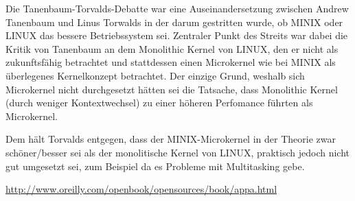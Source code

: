 \documentclass[numbers=noendperiod]{scrartcl}
\begin{document}
Die Tanenbaum-Torvalds-Debatte war eine Auseinandersetzung zwischen Andrew Tanenbaum und Linus Torwalds in der darum gestritten wurde, ob MINIX oder LINUX das bessere Betriebssystem sei. Zentraler Punkt des Streits war dabei die Kritik von Tanenbaum an dem Monolithic Kernel von LINUX, den er nicht als zukunftsfähig betrachtet und stattdessen einen Microkernel wie bei MINIX als überlegenes Kernelkonzept betrachtet. Der einzige Grund, weshalb sich Microkernel nicht durchgesetzt hätten sei die Tatsache, dass Monolithic Kernel (durch weniger Kontextwechsel) zu einer höheren Perfomance führten als Microkernel.

Dem hält Torvalds entgegen, dass der MINIX-Microkernel in der Theorie zwar schöner/besser sei als der monolitische Kernel von LINUX, praktisch jedoch nicht gut umgesetzt sei, zum Beispiel da es Probleme mit Multitasking gebe.


\url{http://www.oreilly.com/openbook/opensources/book/appa.html}
\end{document}
